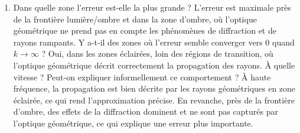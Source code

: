 \documentclass{article}
\begin{document}
\begin{enumerate}
    \item {\color{black} Dans quelle zone l'erreur est-elle la plus grande ?} {\color{blue}L’erreur est maximale près de la frontière lumière/ombre et dans la zone d’ombre, où l’optique géométrique ne prend pas en compte les phénomènes de diffraction et de rayons rampants.} {\color{black} Y a-t-il des zones où l'erreur semble converger vers $0$ quand $k \to \infty$ ?} {\color{blue}Oui, dans les zones éclairées, loin des régions de transition, où l’optique géométrique décrit correctement la propagation des rayons.} {\color{black} À quelle vitesse ?} %
    {\color{black} Peut-on expliquer informellement ce comportement ?} {\color{blue}À haute fréquence, la propagation est bien décrite par les rayons géométriques en zone éclairée, ce qui rend l’approximation précise. En revanche, près de la frontière d’ombre, des effets de la diffraction dominent et ne sont pas capturés par l’optique géométrique, ce qui explique une erreur plus importante.}
\end{enumerate}
\end{document}
